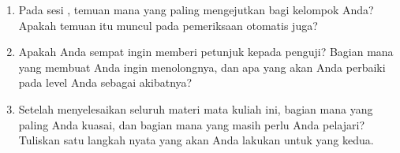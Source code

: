 \begin{refleksibox}
\begin{enumerate}
  \item Pada sesi , temuan mana yang paling mengejutkan
        bagi kelompok Anda? Apakah temuan itu muncul pada pemeriksaan
        otomatis juga?

  \item Apakah Anda sempat ingin memberi petunjuk kepada penguji? Bagian mana
        yang membuat Anda ingin menolongnya, dan apa yang akan Anda perbaiki
        pada level Anda sebagai akibatnya?

  \item Setelah menyelesaikan seluruh materi mata kuliah ini, bagian mana yang
        paling Anda kuasai, dan bagian mana yang masih perlu Anda pelajari?
        Tuliskan satu langkah nyata yang akan Anda lakukan untuk yang kedua.
\end{enumerate}
\end{refleksibox}
